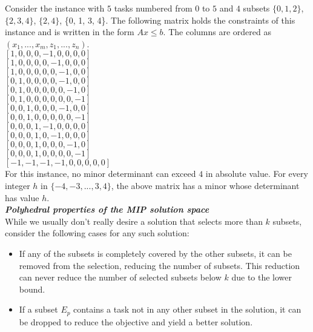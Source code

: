 \documentclass[12pt]{article}
\newcommand{\subheading}[1]{\emph{\textbf{#1}}}
\begin{document}
Consider the instance with $5$ tasks numbered from $0$ to $5$ and $4$ subsets $\{0, 1, 2\}$, $\{2, 3, 4\}$, $\{2, 4\}$, \{0, 1, 3, 4\}. The following matrix holds the constraints of this instance and is written in the form $Ax \leq b$. The columns are ordered as $(x_1, ..., x_m, z_1, ..., z_n)$.\\

$[1, 0, 0, 0, -1, 0, 0, 0, 0]$\\
$[1, 0, 0, 0, 0, -1, 0, 0, 0]$\\
$[1, 0, 0, 0, 0, 0, -1, 0, 0]$\\
$[0, 1, 0, 0, 0, 0, -1, 0, 0]$\\
$[0, 1, 0, 0, 0, 0, 0, -1, 0]$\\
$[0, 1, 0, 0, 0, 0, 0, 0, -1]$\\
$[0, 0, 1, 0, 0, 0, -1, 0, 0]$\\
$[0, 0, 1, 0, 0, 0, 0, 0, -1]$\\
$[0, 0, 0, 1, -1, 0, 0, 0, 0]$\\
$[0, 0, 0, 1, 0, -1, 0, 0, 0]$\\
$[0, 0, 0, 1, 0, 0, 0, -1, 0]$\\
$[0, 0, 0, 1, 0, 0, 0, 0, -1]$\\
$[-1, -1, -1, -1, 0, 0, 0, 0, 0]$\\

For this instance, no minor determinant can exceed $4$ in absolute value. For every integer $h$ in $\{-4, -3, ..., 3, 4\}$, the above matrix has a minor whose determinant has value $h$.\\

\subheading{Polyhedral properties of the MIP solution space}\\

While we usually don't really desire a solution that selects more than $k$ subsets, consider the following cases for any such solution:

\begin{itemize}
\item If any of the subsets is completely covered by the other subsets, it can be removed from the selection, reducing the number of subsets. This reduction can never reduce the number of selected subsets below $k$ due to the lower bound.
\item If a subset $E_p$ contains a task not in any other subset in the solution, it can be dropped to reduce the objective and yield a better solution.
\end{itemize}
\end{document}
